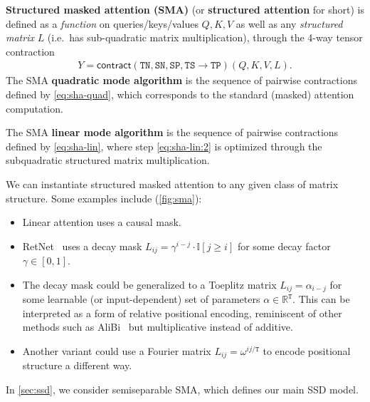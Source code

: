 \begin{definition}%
  \label{def:sma}
  \textbf{Structured masked attention (SMA)} (or \textbf{structured attention} for short) is defined as a \emph{function} on queries/keys/values $Q, K, V$ as well as any \emph{structured matrix} $L$ (i.e.\ has sub-quadratic matrix multiplication), through the 4-way tensor contraction
  \begin{align*}
    Y = \mathsf{contract}(\mathtt{TN},\mathtt{SN},\mathtt{SP},\mathtt{TS} \to \mathtt{TP})(Q, K, V, L)
    .
  \end{align*}
  The SMA \textbf{quadratic mode algorithm} is the sequence of pairwise contractions defined by \eqref{eq:sha-quad},
  which corresponds to the standard (masked) attention computation.

  The SMA \textbf{linear mode algorithm} is the sequence of pairwise contractions defined by \eqref{eq:sha-lin},
  where step \eqref{eq:sha-lin:2} is optimized through the subquadratic structured matrix multiplication.
\end{definition}
We can instantiate structured masked attention to any given class of matrix structure.
Some examples include (\cref{fig:sma}):
\begin{itemize}
  \item Linear attention uses a causal mask.
  \item RetNet~\citep{sun2023retentive} uses a decay mask $L_{ij} = \gamma^{i-j} \cdot \mathbb{I}[j \ge i]$ for some decay factor $\gamma \in [0, 1]$.
  \item The decay mask could be generalized to a Toeplitz matrix $L_{ij} = \alpha_{i-j}$ for some learnable (or input-dependent) set of parameters $\alpha \in \mathbb{R}^\mathtt{T}$. This can be interpreted as a form of relative positional encoding, reminiscent of other methods such as AliBi~\citep{press2022train} but multiplicative instead of additive.
  \item Another variant could use a Fourier matrix $L_{ij} = \omega^{ij / \mathtt{T}}$ to encode positional structure a different way.
\end{itemize}
In \cref{sec:ssd}, we consider semiseparable SMA, which defines our main SSD model.

